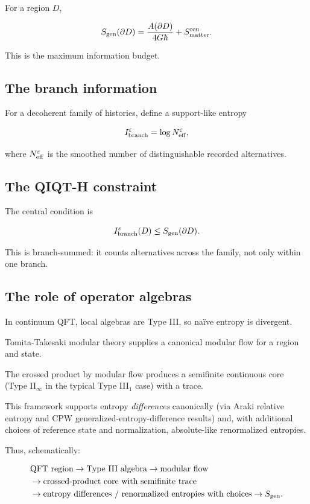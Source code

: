 \documentclass[11pt,a4paper]{article}
\begin{document}
For a region $D$,

\[
S_{\rm gen}(\partial D)
=
\frac{A(\partial D)}{4G\hbar}
+
S_{\rm matter}^{\rm ren}.
\]

This is the maximum information budget.

\subsection{The branch information}

For a decoherent family of histories, define a support-like entropy

\[
I_{\rm branch}^{\varepsilon}
=
\log N_{\rm eff}^{\varepsilon},
\]

where $N_{\rm eff}^{\varepsilon}$ is the smoothed number of distinguishable recorded alternatives.

\subsection{The QIQT-H constraint}

The central condition is

\[
I_{\rm branch}^{\varepsilon}(D)
\leq
S_{\rm gen}(\partial D).
\]

This is branch-summed: it counts alternatives across the family, not only within one branch.

\subsection{The role of operator algebras}

In continuum QFT, local algebras are Type III, so naïve entropy is divergent.

Tomita-Takesaki modular theory supplies a canonical modular flow for a region and state.

The crossed product by modular flow produces a semifinite continuous core (Type II$_\infty$ in the typical Type III$_1$ case) with a trace.

This framework supports entropy \emph{differences} canonically (via Araki relative entropy and CPW generalized-entropy-difference results) and, with additional choices of reference state and normalization, absolute-like renormalized entropies.

Thus, schematically:

\[
\begin{aligned}
&\text{QFT region} \rightarrow \text{Type III algebra} \rightarrow \text{modular flow} \\
&\rightarrow \text{crossed-product core with semifinite trace} \\
&\rightarrow \text{entropy differences / renormalized entropies with choices} \rightarrow S_{\rm gen}.
\end{aligned}
\]
\end{document}
